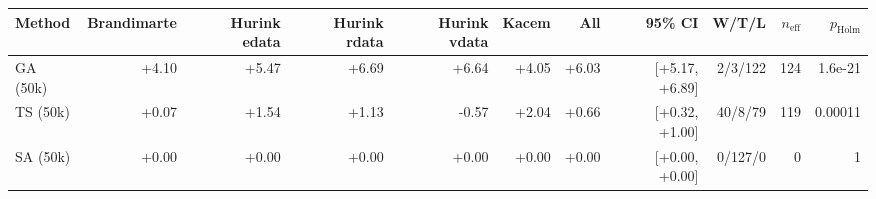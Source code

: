 \begin{tabular}{lrrrrrrrrrr}
\toprule
Method & Brandimarte & Hurink edata & Hurink rdata & Hurink vdata & Kacem & All & 95\% CI & W/T/L & $n_{\mathrm{eff}}$ & $p_{\mathrm{Holm}}$ \\
\midrule
GA (50k) & +4.10 & +5.47 & +6.69 & +6.64 & +4.05 & +6.03 & [+5.17, +6.89] & 2/3/122 & 124 & 1.6e-21 \\
TS (50k) & +0.07 & +1.54 & +1.13 & -0.57 & +2.04 & +0.66 & [+0.32, +1.00] & 40/8/79 & 119 & 0.00011 \\
SA (50k) & +0.00 & +0.00 & +0.00 & +0.00 & +0.00 & +0.00 & [+0.00, +0.00] & 0/127/0 & 0 & 1 \\
\bottomrule
\end{tabular}
